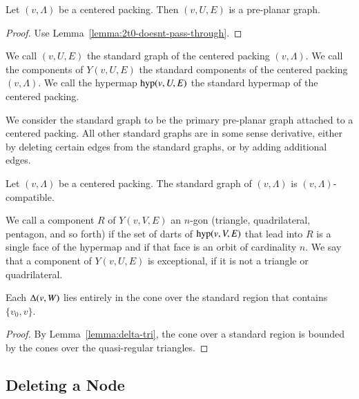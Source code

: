 \begin{lemma}
Let $(v,\Lambda)$ be a centered packing.  Then
$(v,U,E)$ is a pre-planar graph.
\end{lemma}

\begin{proof}
Use Lemma~\ref{lemma:2t0-doesnt-pass-through}.
\end{proof}

\begin{definition}  We call $(v,U,E)$ the standard
graph of the centered packing $(v,\Lambda)$.   We call the
components of $Y(v,U,E)$ the standard components of the centered
packing $(v,\Lambda)$.  We call the hypermap ${\operatorname{hyp}}(v,U,E)$
the standard hypermap of the centered packing.  
\end{definition}

We consider the standard graph  to be the
primary pre-planar graph attached to a centered packing.  All other
standard graphs are in some sense derivative, either by deleting
certain edges from the standard graphs, or by adding additional
edges.


\begin{lemma}
Let $(v,\Lambda)$ be a centered packing.  The standard graph
of $(v,\Lambda)$ is $(v,\Lambda)$-compatible.
\end{lemma}

\begin{definition}  We call a component $R$ of $Y(v,V,E)$ an
$n$-gon (triangle, quadrilateral, pentagon, and so forth) if
the set of darts of ${\operatorname{hyp}}(v,V,E)$ that lead into $R$ is
a single face of the hypermap and if that face is an orbit of
cardinality $n$.   We say that
a component of $Y(v,U,E)$ is exceptional, if it is not a
triangle or quadrilateral.
\end{definition}


\begin{lemma}
Each $\Delta(v,W)$ lies entirely in the cone over the standard
region that contains $\{v_0,v\}$.
\end{lemma}

\begin{proof}
By Lemma~\ref{lemma:delta-tri},
the cone over a standard region is bounded by the cones  over the
quasi-regular triangles.
\end{proof}

\subsection{Deleting a Node}

